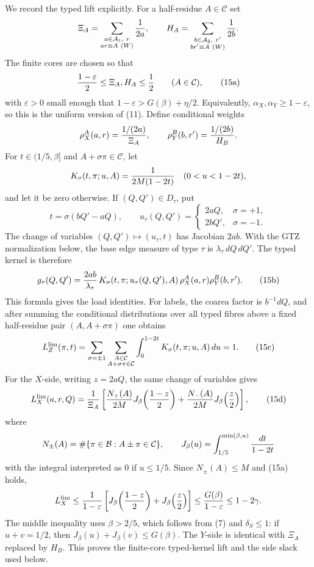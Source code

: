 \documentclass[11pt]{article}
\newcommand{\B}{\mathcal B}
\newcommand{\C}{\mathcal C}
\newcommand{\eps}{\varepsilon}
\begin{document}
We record the typed lift explicitly.  For a half-residue $A\in\C$ set
\[
  \Xi_A=\sum_{\substack{a\in\mathcal A_1,\ r\\ ar\equiv A\ (W)}}{1\over2a},
  \qquad
  H_A=\sum_{\substack{b\in\mathcal A_2,\ r'\\ br'\equiv A\ (W)}}{1\over2b}.
\]
The finite cores are chosen so that
\[
  {1-\eps\over2}\le \Xi_A,H_A\le {1\over2}\qquad(A\in\C),       \tag{15a}
\]
with $\eps>0$ small enough that $1-\eps>G(\beta)+\eta/2$.  Equivalently,
$\alpha_X,\alpha_Y\ge1-\eps$, so this is the uniform version of (11).  Define conditional
weights
\[
  \rho_X^A(a,r)={1/(2a)\over\Xi_A},\qquad
  \rho_Y^B(b,r')={1/(2b)\over H_B}.
\]
For $t\in(1/5,\beta]$ and $A+\sigma\pi\in\C$, let
\[
  K_\sigma(t,\pi;u,A)={1\over2M(1-2t)}
  \quad(0<u<1-2t),
\]
and let it be zero otherwise.  If $(Q,Q')\in D_\tau$, put
\[
  t=\sigma(bQ'-aQ),\qquad
  u_\tau(Q,Q')=
  \begin{cases}
    2aQ,&\sigma=+1,\\
    2bQ',&\sigma=-1.
  \end{cases}
\]
The change of variables $(Q,Q')\mapsto(u_\tau,t)$ has Jacobian $2ab$.
With the GTZ normalization below, the base edge measure of type $\tau$ is
$\lambda_\tau\,dQ\,dQ'$.  The typed kernel is therefore
\[
  g_\tau(Q,Q')
  =
  {2ab\over\lambda_\tau}\,
  K_\sigma(t,\pi;u_\tau(Q,Q'),A)\,
  \rho_X^A(a,r)\rho_Y^B(b,r').                         \tag{15b}
\]
This formula gives the load identities.  For labels, the coarea factor is
$b^{-1}dQ$, and after summing the conditional distributions over all typed
fibres above a fixed half-residue pair $(A,A+\sigma\pi)$ one obtains
\[
  L_Z^{\rm lim}(\pi,t)
  =
  \sum_{\sigma=\pm1}
  \sum_{\substack{A\in\C\\A+\sigma\pi\in\C}}
  \int_0^{1-2t}K_\sigma(t,\pi;u,A)\,du=1.              \tag{15c}
\]
For the $X$-side, writing $z=2aQ$, the same change of variables gives
\[
  L_X^{\rm lim}(a,r,Q)
  =
  {1\over\Xi_A}
  \left[
    {N_+(A)\over2M}J_\beta\!\left({1-z\over2}\right)
    +
    {N_-(A)\over2M}J_\beta\!\left({z\over2}\right)
  \right],                                             \tag{15d}
\]
where
\[
  N_\pm(A)=\#\{\pi\in\B:A\pm\pi\in\C\},\qquad
  J_\beta(u)=\int_{1/5}^{\min(\beta,u)}{dt\over1-2t}
\]
with the integral interpreted as $0$ if $u\le1/5$.  Since $N_\pm(A)\le M$ and
(15a) holds,
\[
  L_X^{\rm lim}
  \le {1\over1-\eps}
  \left[
    J_\beta\!\left({1-z\over2}\right)
    +J_\beta\!\left({z\over2}\right)
  \right]
  \le {G(\beta)\over1-\eps}\le1-2\gamma.
\]
The middle inequality uses $\beta>2/5$, which follows from (7) and
$\delta_S\le1$: if $u+v=1/2$, then
$J_\beta(u)+J_\beta(v)\le G(\beta)$.
The $Y$-side is identical with $\Xi_A$ replaced by $H_B$.  This proves the
finite-core typed-kernel lift and the side slack used below.
\end{document}
